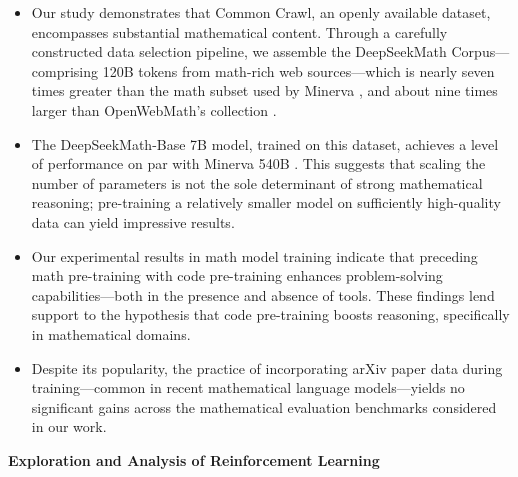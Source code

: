 \begin{itemize}[topsep=0pt]
    \item Our study demonstrates that Common Crawl, an openly available dataset, encompasses substantial mathematical content. Through a carefully constructed data selection pipeline, we assemble the DeepSeekMath Corpus—comprising 120B tokens from math-rich web sources—which is nearly seven times greater than the math subset used by Minerva \citep{minerva}, and about nine times larger than OpenWebMath’s collection \citep{openwebmath}.

    \item The DeepSeekMath-Base 7B model, trained on this dataset, achieves a level of performance on par with Minerva 540B \citep{minerva}. This suggests that scaling the number of parameters is not the sole determinant of strong mathematical reasoning; pre-training a relatively smaller model on sufficiently high-quality data can yield impressive results.

    \item Our experimental results in math model training indicate that preceding math pre-training with code pre-training enhances problem-solving capabilities—both in the presence and absence of tools. These findings lend support to the hypothesis that code pre-training boosts reasoning, specifically in mathematical domains.

    \item Despite its popularity, the practice of incorporating arXiv paper data during training—common in recent mathematical language models—yields no significant gains across the mathematical evaluation benchmarks considered in our work.
\end{itemize}

\textbf{Exploration and Analysis of Reinforcement Learning}

